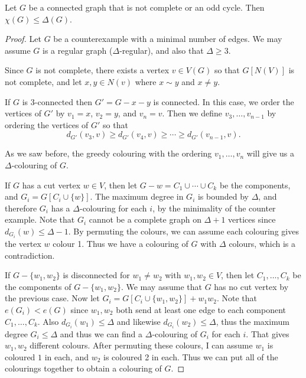 \documentclass[a4paper]{scrreprt}
\begin{document}
\begin{theorem}
	Let $G$ be a connected graph that is not complete or an odd cycle. Then $\chi(G) \leq \Delta(G)$.
\end{theorem}
\begin{proof}
	Let $G$ be a counterexample with a minimal number of edges.
	We may assume $G$ is a regular graph ($\Delta$-regular), and also that $\Delta \geq 3$.

	Since $G$ is not complete, there exists a vertex $v \in V(G)$ so that $G[N(V)]$ is not complete, and let $x, y \in N(v)$ where $x \sim y$ and $x \neq y$. 

	If $G$ is 3-connected then $G' = G - x - y$ is connected. In this case, we order the vertices of $G'$ by $v_1 = x$, $v_2 = y$, and $v_n = v$. Then we define $v_3, \dots, v_{n - 1}$ by ordering the vertices of $G'$ so that
	$$
		d_{G'}(v_3, v) \geq d_{G'}(v_4, v) \geq \cdots \geq d_{G'}(v_{n - 1}, v).
	$$
	
	As we saw before, the greedy colouring with the ordering $v_1, \dots, v_n$ will give us a $\Delta$-colouring of $G$.

	If $G$ has a cut vertex $w \in V$, then let $G- w = C_1 \cup \cdots \cup C_k$ be the components, and $G_i = G[C_i \cup \{w\}]$. The maximum degree in $G_i$ is bounded by $\Delta$, and therefore $G_i$ has a $\Delta$-colouring for each $i$, by the minimality of the counter example. 
	Note that $G_i$ cannot be a complete graph on $\Delta + 1$ vertices since $d_{G_i}(w) \leq \Delta - 1$.
	By permuting the colours, we can assume each colouring gives the vertex $w$ colour 1. Thus we have a colouring of $G$ with $\Delta$ colours, which is a contradiction.

	If $G-\{w_1, w_2\}$ is disconnected for $w_1 \neq w_2$ with $w_1, w_2 \in V$, then let $C_1, \dots, C_k$ be the components of $G - \{w_1, w_2\}$. We may assume that $G$ has no cut vertex by the previous case. Now let $G_i = G[C_i \cup \{w_1, w_2\}]+ w_1w_2$. Note that $e(G_i) < e(G)$ since $w_1, w_2$ both send at least one edge to each component $C_1, \dots, C_k$. Also $d_{G_i}(w_1) \leq \Delta$ and likewise $d_{G_i}(w_2) \leq \Delta$, thus the maximum degree $G_i \leq \Delta$ and thus we can find a $\Delta$-colouring of $G_i$ for each $i$. That gives $w_1, w_2$ different colours. After permuting these colours, I can assume $w_1$ is coloured $1$ in each, and $w_2$ is coloured 2 in each. Thus we can put all of the colourings together to obtain a colouring of $G$.
\end{proof}
\end{document}
